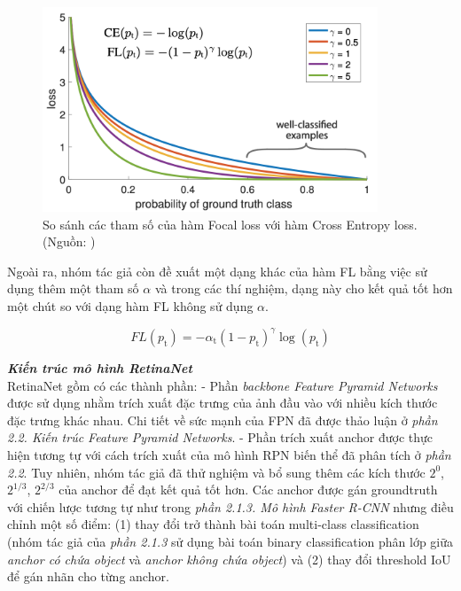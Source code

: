 {    \begin{figure}[H]
        \centering
        \includegraphics[width=10cm] {images/retinanet_focal_loss_curve}
        \caption{So sánh các tham số của hàm Focal loss với hàm Cross Entropy loss. (Nguồn: \cite{lin2017focal})}
        \label{fig:retinanet_focal_loss_curve}
    \end{figure}

    \noindent
    Ngoài ra, nhóm tác giả còn đề xuất một dạng khác của hàm FL bằng việc sử dụng thêm một tham số $\alpha$ và trong các thí nghiệm, dạng này cho kết quả tốt hơn một chút so với dạng hàm FL không sử dụng $\alpha$.

    \begin{equation}
        FL(p_\textrm{t}) = - \alpha_\textrm{t} (1 - p_\textrm{t})^\gamma \log (p_\textrm{t})
    \end{equation}
    
    \noindent
    \textbf{\textit{Kiến trúc mô hình RetinaNet}} \\
    RetinaNet gồm có các thành phần:
    - Phần \textit{backbone Feature Pyramid Networks} được sử dụng nhằm trích xuất đặc trưng của ảnh đầu vào với nhiều kích thước đặc trưng khác nhau.
    Chi tiết về sức mạnh của FPN đã được thảo luận ở \textit{phần 2.2. Kiến trúc Feature Pyramid Networks}.
    - Phần trích xuất anchor được thực hiện tương tự với cách trích xuất của mô hình RPN biến thể đã phân tích ở \textit{phần 2.2}.
    Tuy nhiên, nhóm tác giả đã thử nghiệm và bổ sung thêm các kích thước $2^{0}$, $2^{1/3}$, $2^{2/3}$ của anchor để đạt kết quả tốt hơn.
    Các anchor được gán groundtruth với chiến lược tương tự như trong \textit{phần 2.1.3. Mô hình Faster R-CNN} nhưng điều chỉnh một số điểm: (1) thay đổi trở thành bài toán multi-class classification (nhóm tác giả của \textit{phần 2.1.3} sử dụng bài toán binary classification phân lớp giữa \textit{anchor có chứa object} và \textit{anchor không chứa object}) và (2) thay đổi threshold IoU để gán nhãn cho từng anchor.

}
